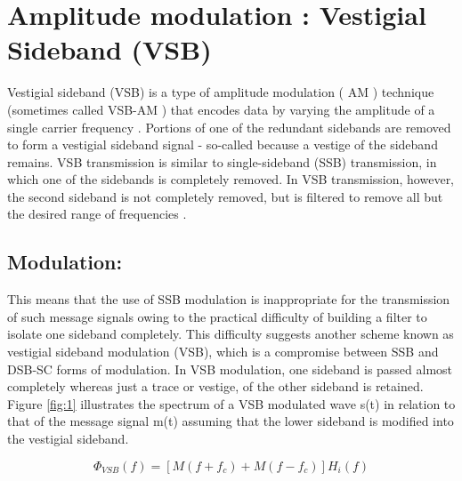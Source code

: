 \section{Amplitude modulation : Vestigial Sideband (VSB)}
Vestigial sideband (VSB) is a type of amplitude modulation ( AM ) technique (sometimes called VSB-AM ) that encodes data by varying the amplitude of a single carrier frequency . Portions of one of the redundant sidebands are removed to form a vestigial sideband signal - so-called because a vestige of the sideband remains.
VSB transmission is similar to single-sideband (SSB) transmission, in which one of the sidebands is completely removed. In VSB transmission, however, the second sideband is not completely removed, but is filtered to remove all but the desired range of frequencies .
\subsection{Modulation:}
This means that the use of SSB modulation is inappropriate for the transmission of such message signals owing to the practical difficulty of building a filter to isolate one sideband completely.
This difficulty suggests another scheme known as vestigial sideband modulation (VSB), which is a compromise between SSB and DSB-SC forms of modulation. In VSB modulation, one sideband is passed almost completely whereas just a trace or vestige, of the other sideband is retained. Figure \ref{fig:1} illustrates the spectrum of a VSB modulated wave s(t) in relation to that of the message signal m(t) assuming that the lower sideband is modified into the vestigial sideband.

\begin{equation}
    \Phi_{VSB}(f) = [M(f+f_c) + M(f-f_c)]H_i(f)
\end{equation}

